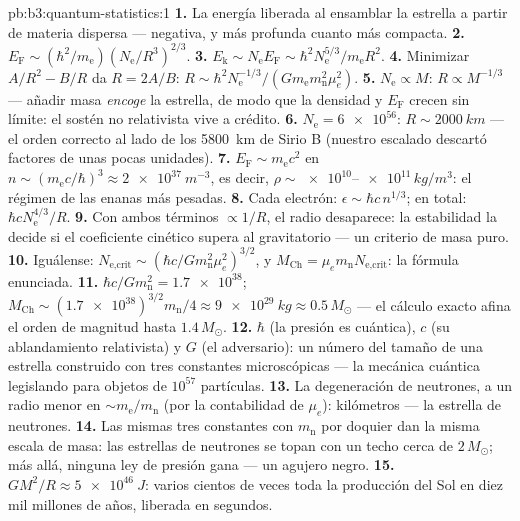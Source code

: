 \begin{solution}{pb:b3:quantum-statistics:1}
\textbf{1.} La energía liberada al ensamblar la estrella a partir de materia
dispersa --- negativa, y más profunda cuanto más compacta.
\textbf{2.} $E_{\text{F}} \sim (\hbar^2/m_{\text{e}})
(N_{\text{e}}/R^3)^{2/3}$.
\textbf{3.} $E_{\text{k}} \sim N_{\text{e}}E_{\text{F}} \sim
\hbar^2N_{\text{e}}^{5/3}/m_{\text{e}}R^2$.
\textbf{4.} Minimizar $A/R^2 - B/R$ da $R = 2A/B$: $R \sim
\hbar^2N_{\text{e}}^{-1/3}/(Gm_{\text{e}}m_{\text{n}}^2\mu_e^2)$.
\textbf{5.} $N_{\text{e}} \propto M$: $R \propto M^{-1/3}$ ---
añadir masa \emph{encoge} la estrella, de modo que la densidad y $E_{\text{F}}$
crecen sin límite: el sostén no relativista vive a
crédito.
\textbf{6.} $N_{\text{e}} = \num{6e56}$: $R \sim \qty{2000}{km}$
--- el orden correcto al lado de los \qty{5800}{km} de Sirio B (nuestro
escalado descartó factores de unas pocas unidades).
\textbf{7.} $E_{\text{F}} \sim m_{\text{e}}c^2$ en $n \sim
(m_{\text{e}}c/\hbar)^3 \approx \qty{2e37}{m^{-3}}$, es decir, $\rho
\sim \num{e10}$--$\num{e11}\,\unit{kg/m^3}$: el régimen de las
enanas más pesadas.
\textbf{8.} Cada electrón: $\epsilon \sim \hbar c\,n^{1/3}$;
en total: $\hbar cN_{\text{e}}^{4/3}/R$.
\textbf{9.} Con ambos términos $\propto 1/R$, el radio desaparece:
la estabilidad la decide si el coeficiente cinético supera
al gravitatorio --- un criterio de masa puro.
\textbf{10.} Iguálense: $N_{\text{e,crit}} \sim (\hbar c/
Gm_{\text{n}}^2\mu_e^2)^{3/2}$, y $M_{\text{Ch}} =
\mu_em_{\text{n}}N_{\text{e,crit}}$: la fórmula enunciada.
\textbf{11.} $\hbar c/Gm_{\text{n}}^2 = \num{1.7e38}$;
$M_{\text{Ch}} \sim (\num{1.7e38})^{3/2}m_{\text{n}}/4 \approx
\qty{9e29}{kg} \approx 0.5\,M_\odot$ --- el cálculo exacto
afina el orden de magnitud hasta $1.4\,M_\odot$.
\textbf{12.} $\hbar$ (la presión es cuántica), $c$ (su
ablandamiento relativista) y $G$ (el adversario): un número del tamaño de una
estrella construido con tres constantes microscópicas --- la mecánica cuántica
legislando para objetos de $10^{57}$ partículas.
\textbf{13.} La degeneración de neutrones, a un radio menor en
$\sim m_{\text{e}}/m_{\text{n}}$ (por la contabilidad de $\mu_e$):
kilómetros --- la estrella de neutrones.
\textbf{14.} Las mismas tres constantes con $m_{\text{n}}$
por doquier dan la misma escala de masa: las estrellas de neutrones se topan
con un techo cerca de $2\,M_\odot$; más allá, ninguna ley de presión gana ---
un agujero negro.
\textbf{15.} $GM^2/R \approx \qty{5e46}{J}$: varios cientos de veces
toda la producción del Sol en diez mil millones de años, liberada en segundos.

\end{solution}
